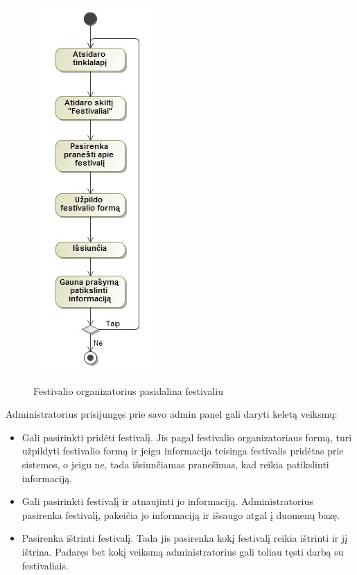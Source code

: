 ﻿\documentclass{VUMIFPSkursinis}
\begin{document}
\begin{figure}[H]
	\centering
    \includegraphics[scale=0.5]{img/Pav/FestOrgFestivalis}
	\label{uml:25}
	\caption{Festivalio organizatorius pasidalina festivaliu}
\end{figure}

Administratorius prisijungęs prie savo admin panel gali daryti keletą veiksmų:
\begin{itemize}
\item Gali pasirinkti pridėti festivalį. Jis pagal festivalio organizatoriaus formą, turi užpildyti festivalio formą ir jeigu informacija teisinga festivalis pridėtas prie sistemos, o jeigu ne, tada išsiunčiamas pranešimas, kad reikia patikslinti informaciją.
\item Gali pasirinkti festivalį ir atnaujinti jo informaciją. Administratorius pasirenka festivalį, pakeičia jo informaciją ir išsaugo atgal į duomenų bazę.
\item Pasirenka ištrinti festivalį. Tada jis pasirenka kokį festivalį reikia ištrinti ir jį ištrina.
Padaręs bet kokį veiksmą administratorius gali toliau tęsti darbą su festivaliais.
\end{itemize}
\end{document}
